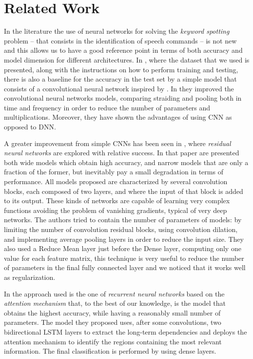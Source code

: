 
\section{Related Work}
\label{sec:related_work}

In the literature the use of neural networks for solving the \textit{keyword spotting} problem -- that consists in the identification of speech commands -- is not new and this allows us to have a good reference point in terms of both accuracy and model dimension for different architectures. In \cite{4}, where the dataset that we used is presented, along with the instructions on how to perform training and testing, there is also a baseline for the accuracy in the test set by a simple model that consists of a convolutional neural network inspired by \cite{10}. In \cite{3} they improved the convolutional neural networks models, comparing straiding and pooling both in time and frequency in order to reduce the number of parameters and multiplications. Moreover, they have shown the advantages of using CNN as opposed to DNN.


A greater improvement from simple CNNs has been seen in \cite{2}, where \textit{residual neural networks} are explored with relative success. In that paper are presented both wide models which obtain high accuracy, and narrow models that are only a fraction of the former, but inevitably pay a small degradation in terms of performance.
All models proposed are characterized by several convolution blocks, each composed of two layers, and where the input of that block is added to its output. These kinds of networks are capable of learning very complex functions avoiding the problem of vanishing gradients, typical of very deep networks. The authors tried to contain the number of parameters of models: by limiting the number of convolution residual blocks, using convolution dilation, and implementing average pooling layers in order to reduce the input size.
They also used a Reduce Mean layer just before the Dense layer, computing only one value for each feature matrix, this technique is very useful to reduce the number of parameters in the final fully connected layer and we noticed that it works well as regularization.


In \cite{1} the approach used is the one of \textit{recurrent neural networks} based on the \textit{attention mechanism} that, to the best of our knowledge, is the model that obtains the highest accuracy, while having a reasonably small number of parameters. The model they proposed uses, after some convolutions, two bidirectional LSTM layers to extract the long-term dependencies and deploys the attention mechanism to identify the regions containing the most relevant information. The final classification is performed by using dense layers.


